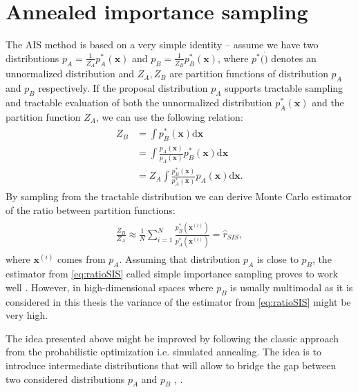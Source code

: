 \section{Annealed importance sampling}
The AIS method is based on a very simple identity -- assume we have two distributions $p_A= \frac{1}{Z_A}p_A^*(\mathbf{x})$ and $p_B= \frac{1}{Z_B}p_B^*(\mathbf{x})$, where $p^*(\dot)$ denotes an unnormalized distribution and $Z_A, Z_B$ are partition functions of distribution $p_A$ and $p_B$ respectively. If the proposal distribution $p_A$ supports tractable sampling and tractable evaluation of both the unnormalized distribution $p_A^*(\mathbf{x})$ and the partition function $Z_A$, we can use the following relation:
\begin{align}
\begin{split}
Z_B & = \int p^*_B(\mathbf{x}) \text{d} \mathbf{x} \\ 
 &= \int \frac{p_A(\mathbf{x})}{p_A(\mathbf{x})} p^*_B(\mathbf{x}) \text{d} \mathbf{x}\\
 &=  Z_A \int \frac{ p^*_B(\mathbf{x}) }{ p^*_A(\mathbf{x}) }p_A(\mathbf{x})  \text{d} \mathbf{x} .
\end{split}
\end{align}
By sampling from the tractable distribution we can derive Monte Carlo estimator of the ratio between partition functions:
\begin{align}
\begin{split}
\frac{Z_B}{Z_A} \approx \frac{1}{N} \sum_{i=1}^N \frac{ p^*_B(\mathbf{x}^{(i)}) }{ p^*_A(\mathbf{x}^{(i)}) } = \hat{r}_{SIS},
\label{eq:ratioSIS}
\end{split}
\end{align}
where $\mathbf{x}^{(i)}$ comes from $p_A$.
Assuming that distribution $p_A$ is close to $p_B$, the estimator from  \ref{eq:ratioSIS} called simple importance sampling proves to work well \cite{minka2005divergence}. However, in high-dimensional spaces where $p_B$ is usually multimodal as it is considered in this thesis the variance of the estimator from \ref{eq:ratioSIS} might be very high. 

The idea presented above might be improved by following the classic approach from the probabilistic optimization i.e. simulated annealing. The idea is to introduce intermediate distributions that will allow to bridge the gap between two considered distributions $p_A$ and $p_B$ \cite{jarzynski1997nonequilibrium}, \cite{neal2001annealed}.

